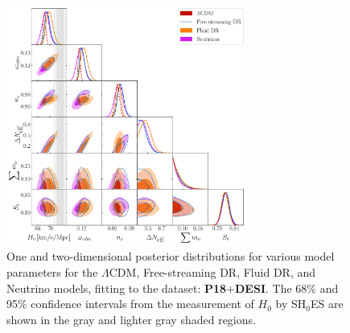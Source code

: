 \documentclass[aps,prd,twocolumn,notitlepage,
superscriptaddress,
nofootinbib,floatfix]{revtex4-2}
\newcommand{\planck}{\textbf{P18}}
\newcommand{\desi}{$\mathbf{+}$\textbf{DESI}}
\begin{document}
\begin{widetext}
\begin{figure}[H]
\centering
    \includegraphics[width=0.7\textwidth]{figures_21_4/all_D.pdf}
    \caption{One and two-dimensional posterior distributions for various model parameters for the $\Lambda$CDM, Free-streaming DR, Fluid DR, and Neutrino models, fitting to the dataset: \planck\desi. The 68\% and 95\% confidence intervals from the measurement of $H_0$ by SH$_0$ES are shown in the gray and lighter gray shaded regions.}
\end{figure}


\end{widetext}
\end{document}
